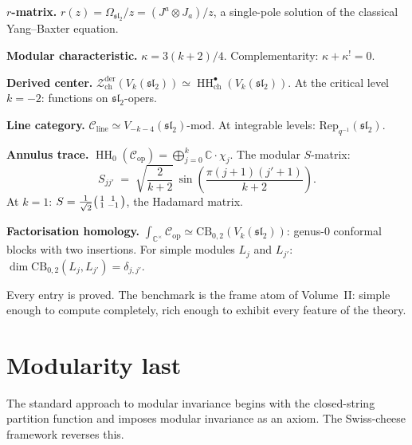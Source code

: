 \documentclass[11pt]{article}
\newcommand{\cC}{\mathcal{C}}
\newcommand{\cZ}{\mathcal{Z}}
\newcommand{\fsl}{\mathfrak{sl}}
\newcommand{\C}{\mathbb{C}}
\newcommand{\HH}{\operatorname{HH}}
\newcommand{\Zder}{\cZ^{\mathrm{der}}_{\mathrm{ch}}}
\begin{document}
\medskip

\noindent
\textbf{$r$-matrix.}
$r(z) = \Omega_{\fsl_2}/z = (J^a \otimes J_a)/z$, a single-pole
solution of the classical Yang--Baxter equation.

\medskip

\noindent
\textbf{Modular characteristic.}
$\kappa = 3(k+2)/4$.  Complementarity: $\kappa + \kappa^! = 0$.

\medskip

\noindent
\textbf{Derived center.}
$\Zder(V_k(\fsl_2)) \simeq \HH^\bullet_{\mathrm{ch}}(V_k(\fsl_2))$.
At the critical level $k = -2$: functions on $\fsl_2$-opers.

\medskip

\noindent
\textbf{Line category.}
$\cC_{\mathrm{line}} \simeq V_{-k-4}(\fsl_2)\text{-mod}$.
At integrable levels: $\mathrm{Rep}_{q^{-1}}(\fsl_2)$.

\medskip

\noindent
\textbf{Annulus trace.}
$\HH_0(\cC_{\mathrm{op}}) = \bigoplus_{j=0}^k \C \cdot \chi_j$.
The modular $S$-matrix:
\[
S_{jj'} \;=\; \sqrt{\frac{2}{k+2}}\,
\sin\!\left(\frac{\pi(j+1)(j'+1)}{k+2}\right).
\]
At $k = 1$: $S = \frac{1}{\sqrt{2}}
\begin{psmallmatrix} 1 & 1 \\ 1 & -1 \end{psmallmatrix}$,
the Hadamard matrix.

\medskip

\noindent
\textbf{Factorisation homology.}
$\int_{\C^\times}\!\cC_{\mathrm{op}}
\simeq \mathrm{CB}_{0,2}(V_k(\fsl_2))$:
genus-$0$ conformal blocks with two insertions.  For simple
modules $L_j$ and $L_{j'}$:
$\dim \mathrm{CB}_{0,2}(L_j, L_{j'}) = \delta_{j,j'}$.

\medskip

Every entry is proved.  The benchmark is the frame atom of
Volume~II: simple enough to compute completely, rich enough to
exhibit every feature of the theory.


\section{Modularity last}
\label{sec:modularity-last}

The standard approach to modular invariance begins with the
closed-string partition function and imposes modular invariance
as an axiom.  The Swiss-cheese framework reverses this.
\end{document}
